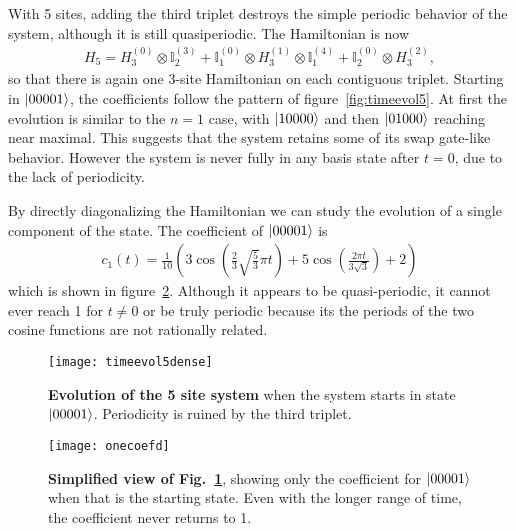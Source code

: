 With 5 sites, adding the third triplet destroys the simple periodic behavior of the system, although it is still quasiperiodic. The Hamiltonian is now
\begin{align}
H_5 = H_3^{(0)}\otimes\mathbb{I}_2^{(3)} + 
	\mathbb{I}_1^{(0)}\otimes H_3^{(1)}\otimes\mathbb{I}_1^{(4)} +
	\mathbb{I}_2^{(0)}\otimes H_3^{(2)},
\end{align} 
so that there is again one 3-site Hamiltonian on each contiguous triplet.
Starting in $\left|00001\right\rangle$, the coefficients follow the pattern of figure~\ref{fig:timeevol5}. At first the evolution is similar to the $n=1$ case, with $\left|10000\right\rangle$ and then $\left|01000\right\rangle$ reaching near maximal. This suggests that the system retains some of its swap gate-like behavior. However the system is never fully in any basis state after $t=0$, due to the lack of periodicity.

By directly diagonalizing the Hamiltonian we can study the evolution of a single component of the state. The coefficient of $\left|00001\right\rangle$ is 
\begin{align}
c_1(t) = \frac{1}{10} \left(3 \cos \left(\frac{2}{3} \sqrt{\frac{5}{3}} \pi  t\right)+5 \cos \left(\frac{2 \pi  t}{3 \sqrt{3}}\right)+2\right)
\end{align} 
which is shown in figure~\ref{fig:onecoef}. Although it appears to be quasi-periodic, it cannot ever reach 1 for $t\ne 0$ or be truly periodic because its the periods of the two cosine functions are not rationally related.

\begin{figure}
	\centering
	\texttt{[image: timeevol5dense]}
	\caption{\textbf{Evolution of the 5 site system} when the system starts in state $\left|00001\right\rangle$. Periodicity is ruined by the third triplet.}
	\label{fig:timeevol5dense}
\end{figure}

\begin{figure}
	\centering
	\texttt{[image: onecoefd]}
	\caption{\textbf{Simplified view of Fig.~\ref{fig:timeevol5dense}}, showing only the coefficient for $\left|00001\right\rangle$ when that is the starting state. Even with the longer range of time, the coefficient never returns to 1.}
	\label{fig:onecoef}
\end{figure}


